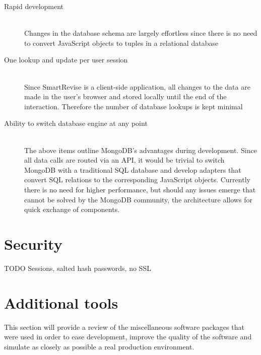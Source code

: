 \documentclass[bsc,frontabs,twoside,singlespacing,parskip]{infthesis}     %
\begin{document}
		\begin{description}
			\item[Rapid development] \hfill \\
				Changes in the database schema are largely effortless since there is no need to convert JavaScript objects to tuples in a relational database
			\item[One lookup and update per user session] \hfill \\
				Since SmartRevise is a client-side application, all changes to the data are made in the user's browser and stored locally until the end of the interaction. Therefore the number of database lookups is kept minimal
			\item[Ability to switch database engine at any point] \hfill \\
				The above items outline MongoDB's advantages during development. Since all data calls are routed via an API, it would be trivial to switch MongoDB with a traditional SQL database and develop adapters that convert SQL relations to the corresponding JavaScript objects. Currently there is no need for higher performance, but should any issues emerge that cannot be solved by the MongoDB community, the architecture allows for quick exchange of components.
		\end{description}


	\section{Security}\label{security}
	TODO
	Sessions, salted hash passwords, no SSL

	\section{Additional tools}\label{tools}

		This section will provide a review of the miscellaneous software packages that were used in order to ease development, improve the quality of the software and simulate as closely as possible a real production environment.
\end{document}
